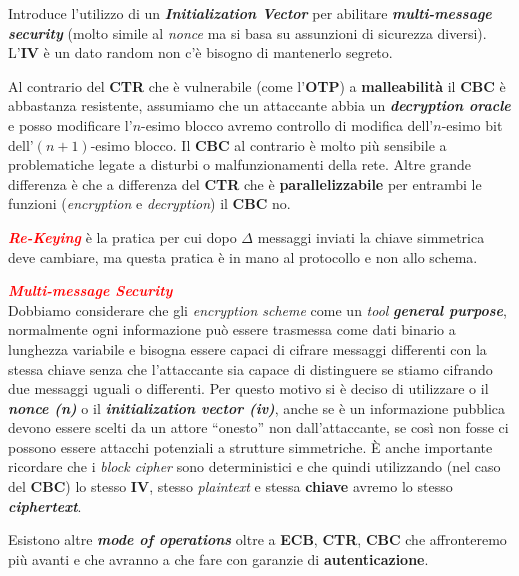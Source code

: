 \begin{flushleft}
    \medskip

    Introduce l'utilizzo di un \textbf{\textit{Initialization Vector}} per abilitare \textbf{\textit{multi-message security}} (molto simile al \textit{nonce} ma si basa su assunzioni di sicurezza diversi). L'\textbf{IV} è un dato random non c'è bisogno di mantenerlo segreto.

    \medskip

    Al contrario del \textbf{CTR} che è vulnerabile (come l'\textbf{OTP}) a \textbf{malleabilità} il \textbf{CBC} è abbastanza resistente, assumiamo che un attaccante abbia un \textbf{\textit{decryption oracle}} e posso modificare l'$n$-esimo blocco avremo controllo di modifica dell'$n$-esimo bit dell'$(n + 1)$-esimo blocco. Il \textbf{CBC} al contrario è molto più sensibile a problematiche legate a disturbi o malfunzionamenti della rete. Altre grande differenza è che a differenza del \textbf{CTR} che è \textbf{parallelizzabile} per entrambi le funzioni (\textit{encryption} e \textit{decryption}) il \textbf{CBC} no.

    \medskip

    \textcolor{red}{\textbf{\textit{Re-Keying}}} è la pratica per cui dopo $\Delta$ messaggi inviati la chiave simmetrica deve cambiare, ma questa pratica è in mano al protocollo e non allo schema.

\end{flushleft}

\begin{flushleft}
    \textcolor{red}{\textbf{\textit{Multi-message Security}}} \\
    Dobbiamo considerare che gli \textit{encryption scheme} come un \textit{tool} \textbf{\textit{general purpose}}, normalmente ogni informazione può essere trasmessa come dati binario a lunghezza variabile e bisogna essere capaci di cifrare messaggi differenti con la stessa chiave senza che l'attaccante sia capace di distinguere se stiamo cifrando due messaggi uguali o differenti. Per questo motivo si è deciso di utilizzare o il \textbf{\textit{nonce (n)}} o il \textbf{\textit{initialization vector (iv)}}, anche se è un informazione pubblica devono essere scelti da un attore ``onesto'' non dall'attaccante, se così non fosse ci possono essere attacchi potenziali a strutture simmetriche. È anche importante ricordare che i \textit{block cipher} sono deterministici e che quindi utilizzando (nel caso del \textbf{CBC}) lo stesso \textbf{IV}, stesso \textit{plaintext} e stessa \textbf{chiave} avremo lo stesso \textbf{\textit{ciphertext}}.

    \medskip

    Esistono altre \textbf{\textit{mode of operations}} oltre a \textbf{ECB}, \textbf{CTR}, \textbf{CBC} che affronteremo più avanti e che avranno a che fare con garanzie di \textbf{autenticazione}.
\end{flushleft}

